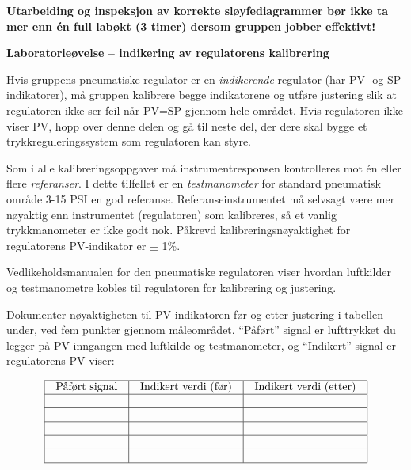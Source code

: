\vskip 10pt

{\bf Utarbeiding og inspeksjon av korrekte sløyfediagrammer bør ikke ta mer enn én full labøkt (3 timer) dersom gruppen jobber effektivt!}




\vfil \eject

\noindent
{\bf Laboratorieøvelse -- indikering av regulatorens kalibrering}

\vskip 5pt

Hvis gruppens pneumatiske regulator er en {\it indikerende} regulator (har PV- og SP-indikatorer), må gruppen kalibrere begge indikatorene og utføre justering slik at regulatoren ikke ser feil når PV=SP gjennom hele området. Hvis regulatoren ikke viser PV, hopp over denne delen og gå til neste del, der dere skal bygge et trykkreguleringssystem som regulatoren kan styre.

Som i alle kalibreringsoppgaver må instrumentresponsen kontrolleres mot én eller flere {\it referanser}. I dette tilfellet er en {\it testmanometer} for standard pneumatisk område 3-15 PSI en god referanse. Referanseinstrumentet må selvsagt være mer nøyaktig enn instrumentet (regulatoren) som kalibreres, så et vanlig trykkmanometer er ikke godt nok. Påkrevd kalibreringsnøyaktighet for regulatorens PV-indikator er $\pm$ 1\%.

Vedlikeholdsmanualen for den pneumatiske regulatoren viser hvordan luftkilder og testmanometre kobles til regulatoren for kalibrering og justering.

\filbreak

Dokumenter nøyaktigheten til PV-indikatoren før og etter justering i tabellen under, ved fem punkter gjennom måleområdet. ``Påført'' signal er lufttrykket du legger på PV-inngangen med luftkilde og testmanometer, og ``Indikert'' signal er regulatorens PV-viser:


$$\vbox{\offinterlineskip
\halign{\strut
\vrule \quad\hfil # \ \hfil & 
\vrule \quad\hfil # \ \hfil & 
\vrule \quad\hfil # \ \hfil \vrule \cr
\noalign{\hrule}
%
Påført signal & Indikert verdi (før) & Indikert verdi (etter) \cr
%
\noalign{\hrule}
%
 &  & \cr
%
\noalign{\hrule}
%
 &  & \cr
%
\noalign{\hrule}
%
 &  & \cr
%
\noalign{\hrule}
%
 &  & \cr
%
\noalign{\hrule}
%
 &  & \cr
%
\noalign{\hrule}
} %
}$$ %

